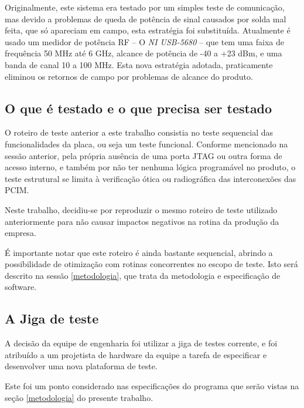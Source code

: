                 Originalmente, este sistema era testado por um simples teste de comunicação, mas devido a problemas de queda de potência de sinal causados por solda mal feita, que só apareciam em campo, esta estratégia foi substituída. Atualmente é usado um medidor de potência RF -- O \emph{NI USB-5680} -- que tem uma faixa de frequência 50 MHz até 6 GHz, alcance de potência de -40 a +23 dBm, e uma banda de canal 10 a 100 MHz. Esta nova estratégia adotada, praticamente eliminou os retornos de campo por problemas de alcance do produto.

    \subsection{O que é testado e o que precisa ser testado}
        
        
        O roteiro de teste anterior a este trabalho consistia no teste sequencial das funcionalidades da placa, ou seja um teste funcional. Conforme mencionado na sessão anterior, pela própria ausência de uma porta JTAG ou outra forma de acesso interno, e também por não ter nenhuma lógica programável no produto, o teste estrutural se limita à verificação ótica ou radiográfica das interconexões das PCIM. 
        
        Neste trabalho, decidiu-se por reproduzir o mesmo roteiro de teste utilizado anteriormente para não causar impactos negativos na rotina da produção da empresa. 
        
        É importante notar que este roteiro é ainda bastante sequencial, abrindo a possibilidade de otimização com rotinas concorrentes no escopo de teste. Isto será descrito na sessão \ref{metodologia}, que trata da metodologia e especificação de software.
        
        

    \subsection{A Jiga de teste}
        
        A decisão da equipe de engenharia foi utilizar a jiga de testes corrente, e foi atribuído a um projetista de hardware da equipe a tarefa de especificar e desenvolver uma nova plataforma de teste. 
        
        Este foi um ponto considerado nas especificações do programa que serão vistas na seção \ref{metodologia} do presente trabalho. 
        
